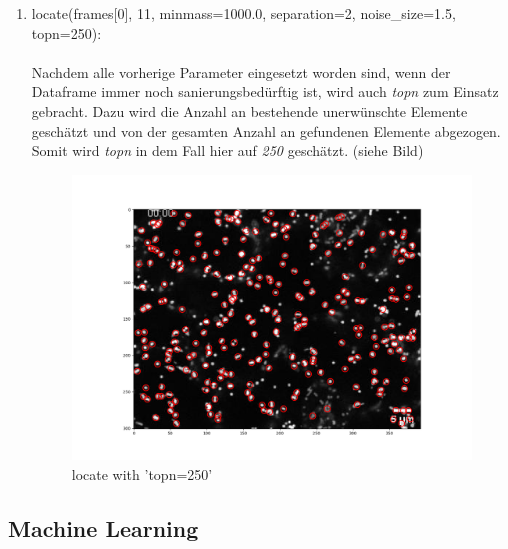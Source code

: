 \begin{enumerate}
\item locate(frames[0], 11, minmass=1000.0, separation=2, noise\_size=1.5, topn=250):    \\ \\ 
		Nachdem alle vorherige Parameter eingesetzt worden sind, wenn der Dataframe immer noch sanierungsbedürftig ist, wird auch \textit{topn} zum Einsatz gebracht. Dazu wird die Anzahl an bestehende unerwünschte Elemente geschätzt und von der gesamten Anzahl an gefundenen Elemente abgezogen. Somit wird \textit{topn} in dem Fall hier auf \textit{250} geschätzt. (siehe Bild)
\begin{figure}[H]
    \centering
    \includegraphics[scale=0.35]{Grafiken/trackpyBilder/locate_with_topn.png}
    \caption{locate with 'topn=250'}
\end{figure}
\end{enumerate}
\subsection{Machine Learning}


